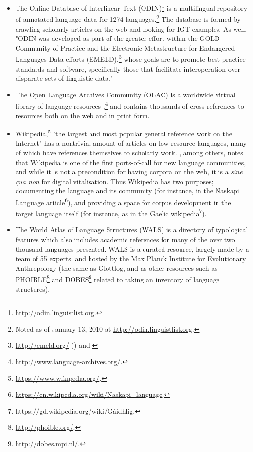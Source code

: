 \begin{itemize}
\item The Online Database of Interlinear Text (ODIN)\footnote{\href{http://odin.linguistlist.org}{http://odin.linguistlist.org}. } is a multilingual repository of annotated language data for 1274 languages.\footnote{Noted as of January 13, 2010 at \href{http://odin.linguistlist.org}{http://odin.linguistlist.org}. } The database is formed by crawling scholarly articles on the web and looking for IGT examples. As well, "ODIN was developed as part of the greater effort within the GOLD Community of Practice \citep{farrar2007gold} and the Electronic Metastructure for Endangered Languages Data efforts (EMELD),\footnote{\href{http://emeld.org/}{http://emeld.org/} () and \citet{farrar2002common}} whose goals are to promote best practice standards and software, specifically those that facilitate interoperation over disparate sets of linguistic data." \citep{lewis2010developing}

\item The Open Language Archives Community (OLAC) is a worldwide virtual library of language resources \citep{simons2003open},\footnote{\href{http://www.language-archives.org/}{http://www.language-archives.org/}. } and contains thousands of cross-references to resources both on the web and in print form.

\item Wikipedia,\footnote{\href{https://www.wikipedia.org/}{https://www.wikipedia.org/}. } "the largest and most popular general reference work on the Internet" \citep{wiki:Wikipedia} has a nontrivial amount of articles on low-resource languages, many of which have references themselves to scholarly work. \citet{kornai2013digital}, among others, notes that Wiki\-pedia is one of the first ports-of-call for new language communities, and while it is not a precondition for having corpora on the web, it is a {\it sine qua non} for digital vitalisation. Thus Wikipedia has two purposes; documenting the language and its community (for instance, in the Naskapi Language article\footnote{\href{https://en.wikipedia.org/wiki/Naskapi\_language}{https://en.wikipedia.org/wiki/Naskapi\_language}. }), and providing a space for corpus development in the target language itself (for instance, as in the Gaelic wikipedia\footnote{\href{https://gd.wikipedia.org/wiki/G\%C3\%A0idhlig}{https://gd.wikipedia.org/wiki/G\`aidhlig}. }).

\item The World Atlas of Language Structures (WALS) \citep{wals} is a directory of typological features which also includes academic references for many of the over two thousand languages presented. WALS is a curated resource, largely made by a team of 55 experts, and hosted by the Max Planck Institute for Evolutionary Anthropology (the same as Glottlog, and as other resources such as PHOIBLE\footnote{\href{http://phoible.org/}{http://phoible.org/}. } \citep{phoible} and DOBES\footnote{\href{http://dobes.mpi.nl/}{http://dobes.mpi.nl/}. } \citep{wittenburg2003dobes} related to taking an inventory of language structures). 
\end{itemize}

